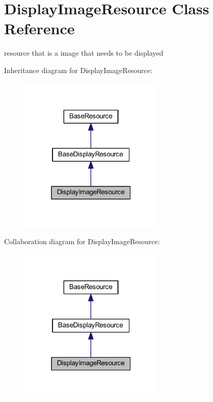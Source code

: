 \hypertarget{class_display_image_resource}{}\section{Display\+Image\+Resource Class Reference}
\label{class_display_image_resource}


resource that is a image that needs to be displayed  




Inheritance diagram for Display\+Image\+Resource\+:
\nopagebreak
\begin{figure}[H]
\begin{center}
\leavevmode
\includegraphics[width=196pt]{class_display_image_resource__inherit__graph}
\end{center}
\end{figure}


Collaboration diagram for Display\+Image\+Resource\+:
\nopagebreak
\begin{figure}[H]
\begin{center}
\leavevmode
\includegraphics[width=196pt]{class_display_image_resource__coll__graph}
\end{center}
\end{figure}
